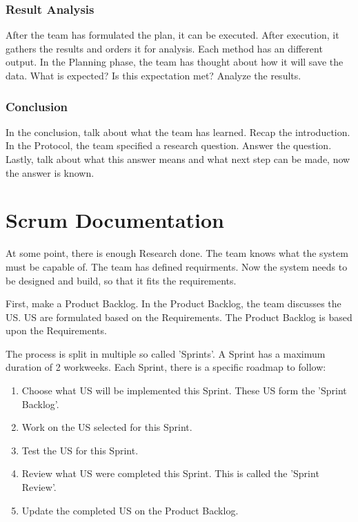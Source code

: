 \documentclass[10pt]{report}
\begin{document}
\subsection{Result Analysis}

After the team has formulated the plan, it can be executed. After execution, it gathers the results and orders it for analysis. Each method has an different output. In the Planning phase, the team has thought about how it will save the data. What is expected? Is this expectation met? Analyze the results.

\subsection{Conclusion}

In the conclusion, talk about what the team has learned. Recap the introduction. In the Protocol, the team specified a research question. Answer the question. Lastly, talk about what this answer means and what next step can be made, now the answer is known.

\newpage

\chapter{Scrum Documentation}
\thispagestyle{fancy}

At some point, there is enough Research done. The team knows what the system must be capable of. The team has defined requirments. Now the system needs to be designed and build, so that it fits the requirements.

First, make a Product Backlog. In the Product Backlog, the team discusses the US. US are formulated based on the Requirements. The Product Backlog is based upon the Requirements.

The process is split in multiple so called 'Sprints'. A Sprint has a maximum duration of 2 workweeks. Each Sprint, there is a specific roadmap to  follow:

\begin{enumerate}
	\item Choose what US will be implemented this Sprint. These US form the 'Sprint Backlog'.
	\item Work on the US selected for this Sprint.
	\item Test the US for this Sprint.
	\item Review what US were completed this Sprint. This is called the 'Sprint Review'.
	\item Update the completed US on the Product Backlog.
\end{enumerate}
\end{document}
